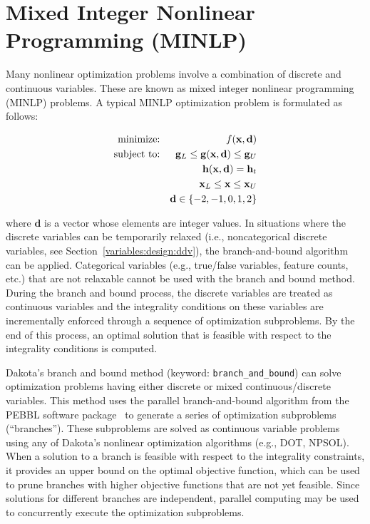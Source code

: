 \section{Mixed Integer Nonlinear Programming (MINLP)}\label{adv_meth:minlp}

Many nonlinear optimization problems involve a combination of discrete
and continuous variables. These are known as mixed integer nonlinear
programming (MINLP) problems. A typical MINLP optimization problem is
formulated as follows:

\begin{eqnarray}
  \hbox{minimize:} & & f(\mathbf{x,d})\nonumber\\
  \hbox{subject to:} & & \mathbf{g}_{L} \leq \mathbf{g(x,d)}
    \leq \mathbf{g}_{U}\nonumber\\
  & & \mathbf{h(x,d)}=\mathbf{h}_{t}\label{adv_meth:equation01}\\
  & & \mathbf{x}_{L} \leq \mathbf{x} \leq \mathbf{x}_{U}\nonumber\\
  & & \mathbf{d} \in \{-2,-1,0,1,2\}\nonumber
\end{eqnarray}

where $\mathbf{d}$ is a vector whose elements are integer values. In
situations where the discrete variables can be temporarily relaxed
(i.e., noncategorical discrete variables, see
Section~\ref{variables:design:ddv}), the branch-and-bound algorithm
can be applied. Categorical variables (e.g., true/false variables,
feature counts, etc.) that are not relaxable cannot be used with the
branch and bound method.  During the branch and bound process, the
discrete variables are treated as continuous variables and the
integrality conditions on these variables are incrementally enforced
through a sequence of optimization subproblems.  By the end of this
process, an optimal solution that is feasible with respect to the
integrality conditions is computed.

Dakota's branch and bound method (keyword:
\texttt{branch\_and\_bound}) can solve optimization problems having
either discrete or mixed continuous/discrete variables. This method
uses the parallel branch-and-bound algorithm from the PEBBL software
package~\cite{Eck09} to generate a series of optimization
subproblems (``branches''). These subproblems are solved as continuous
variable problems using any of Dakota's nonlinear optimization
algorithms (e.g., DOT, NPSOL). When a solution to a branch is feasible
with respect to the integrality constraints, it provides an upper
bound on the optimal objective function, which can be used to prune
branches with higher objective functions that are not yet
feasible. Since solutions for different branches are independent,
parallel computing may be used to concurrently execute the
optimization subproblems.

